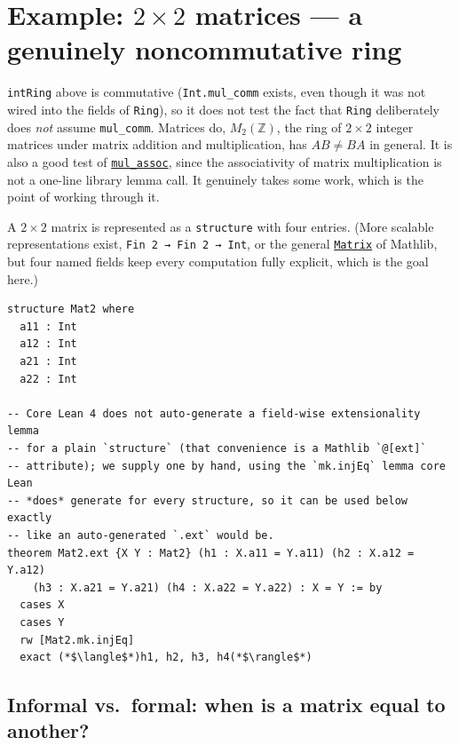 \section{\texorpdfstring{Example: \(2\times 2\) matrices --- a genuinely noncommutative ring}{Example: 2\textbackslash times 2 matrices --- a genuinely noncommutative ring}}\label{sec:09-rings:07-matrices:1}

\texttt{intRing} above is commutative (\texttt{Int.mul\_\allowbreak{}comm} exists, even though it was not wired into the fields of \texttt{Ring}), so it does not test the fact that \texttt{Ring} deliberately does \emph{not} assume \texttt{mul\_\allowbreak{}comm}. Matrices do, \(M_2(\mathbb{Z})\), the ring of \(2\times 2\) integer matrices under matrix addition and multiplication, has \(AB \neq BA\) in general. It is also a good test of \href{https://loogle.lean-lang.org/?q=mul_assoc}{\texttt{mul\_\allowbreak{}assoc}}, since the associativity of matrix multiplication is not a one-line library lemma call. It genuinely takes some work, which is the point of working through it.

A \(2 \times 2\) matrix is represented as a \texttt{structure} with four entries. (More scalable representations exist, \texttt{Fin 2 → Fin 2 → Int}, or the general \href{https://loogle.lean-lang.org/?q=Matrix}{\texttt{Matrix}} of Mathlib, but four named fields keep every computation fully explicit, which is the goal here.)

\begin{lstlisting}
structure Mat2 where
  a11 : Int
  a12 : Int
  a21 : Int
  a22 : Int

-- Core Lean 4 does not auto-generate a field-wise extensionality lemma
-- for a plain `structure` (that convenience is a Mathlib `@[ext]`
-- attribute); we supply one by hand, using the `mk.injEq` lemma core Lean
-- *does* generate for every structure, so it can be used below exactly
-- like an auto-generated `.ext` would be.
theorem Mat2.ext {X Y : Mat2} (h1 : X.a11 = Y.a11) (h2 : X.a12 = Y.a12)
    (h3 : X.a21 = Y.a21) (h4 : X.a22 = Y.a22) : X = Y := by
  cases X
  cases Y
  rw [Mat2.mk.injEq]
  exact (*$\langle$*)h1, h2, h3, h4(*$\rangle$*)
\end{lstlisting}

\subsection{Informal vs.~formal: when is a matrix equal to another?}\label{sec:09-rings:07-matrices:2}

